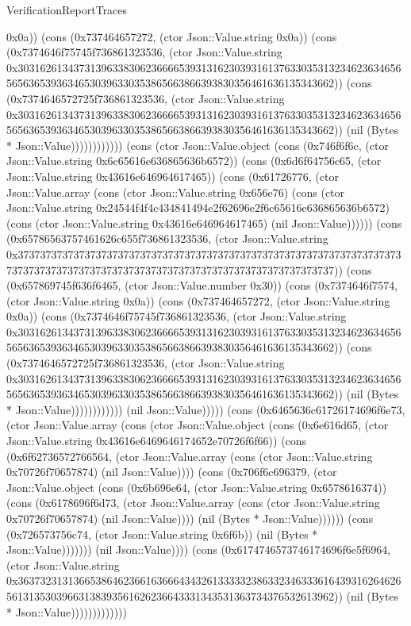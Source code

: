 \begin{lexlean}{VerificationReportTraces}
\begin{semanticmodule}
{0x0a)) (cons (0x737464657272, (ctor Json::Value.string 0x0a)) (cons (0x7374646f75745f736861323536, (ctor Json::Value.string 0x30316261343731396338306236666539313162303931613763303531323462363465656563653936346530396330353865663866393830356461636135343662)) (cons (0x7374646572725f736861323536, (ctor Json::Value.string 0x30316261343731396338306236666539313162303931613763303531323462363465656563653936346530396330353865663866393830356461636135343662)) (nil (Bytes * Json::Value)))))))))))) (cons (ctor Json::Value.object (cons (0x746f6f6c, (ctor Json::Value.string 0x6c65616e636865636b6572)) (cons (0x6d6f64756c65, (ctor Json::Value.string 0x43616e646964617465)) (cons (0x61726776, (ctor Json::Value.array (cons (ctor Json::Value.string 0x656e76) (cons (ctor Json::Value.string 0x24544f4f4c434841494e2f62696e2f6c65616e636865636b6572) (cons (ctor Json::Value.string 0x43616e646964617465) (nil Json::Value)))))) (cons (0x65786563757461626c655f736861323536, (ctor Json::Value.string 0x37373737373737373737373737373737373737373737373737373737373737373737373737373737373737373737373737373737373737373737373737373737)) (cons (0x657869745f636f6465, (ctor Json::Value.number 0x30)) (cons (0x7374646f7574, (ctor Json::Value.string 0x0a)) (cons (0x737464657272, (ctor Json::Value.string 0x0a)) (cons (0x7374646f75745f736861323536, (ctor Json::Value.string 0x30316261343731396338306236666539313162303931613763303531323462363465656563653936346530396330353865663866393830356461636135343662)) (cons (0x7374646572725f736861323536, (ctor Json::Value.string 0x30316261343731396338306236666539313162303931613763303531323462363465656563653936346530396330353865663866393830356461636135343662)) (nil (Bytes * Json::Value)))))))))))) (nil Json::Value))))) (cons (0x6465636c61726174696f6e73, (ctor Json::Value.array (cons (ctor Json::Value.object (cons (0x6e616d65, (ctor Json::Value.string 0x43616e6469646174652e70726f6f66)) (cons (0x6f62736572766564, (ctor Json::Value.array (cons (ctor Json::Value.string 0x70726f70657874) (nil Json::Value)))) (cons (0x706f6c696379, (ctor Json::Value.object (cons (0x6b696e64, (ctor Json::Value.string 0x6578616374)) (cons (0x6178696f6d73, (ctor Json::Value.array (cons (ctor Json::Value.string 0x70726f70657874) (nil Json::Value)))) (nil (Bytes * Json::Value)))))) (cons (0x726573756c74, (ctor Json::Value.string 0x6f6b)) (nil (Bytes * Json::Value))))))) (nil Json::Value)))) (cons (0x6174746573746174696f6e5f6964, (ctor Json::Value.string 0x36373231313665386462366163666434326133333238633234633361643931626462656131353039663138393561626236643331343531363734376532613962)) (nil (Bytes * Json::Value)))))))))))))
}


\end{semanticmodule}
\end{lexlean}
